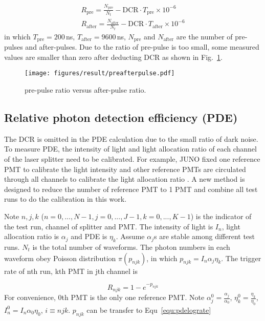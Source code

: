 \begin{align}
    R_{\mathrm{pre}} = \frac{N_{\mathrm{pre}}}{N_t} - \mathrm{DCR}\cdot T_{\mathrm{pre}}\times10^{-6}\\
    R_{\mathrm{after}} = \frac{N_{\mathrm{after}}}{N_t} - \mathrm{DCR}\cdot T_{\mathrm{after}}\times10^{-6}
\end{align}
in which $T_{\mathrm{pre}}=200$\,ns, $T_{\mathrm{after}}=9600$\,ns, $N_{\mathrm{pre}}$ and $N_{\mathrm{after}}$ are the number of pre-pulses and after-pulses. Due to the ratio of pre-pulse is too small, some measured values are smaller than zero after deducting DCR as shown in Fig.~\ref{fig:prepulseCompare}.

\begin{figure}[!htbp]
    \centering
    \texttt{[image: figures/result/preafterpulse.pdf]}
    \caption{pre-pulse ratio versus after-pulse ratio.}
    \label{fig:prepulseCompare}
\end{figure}

\subsection{Relative photon detection efficiency (PDE)}
The DCR is omitted in the PDE calculation due to the small ratio of dark noise. To measure PDE, the intensity of light and light allocation ratio of each channel of the laser splitter need to be calibrated. For example, JUNO fixed one reference PMT to calibrate the light intensity and other reference PMTs are circulated through all channels to calibrate the light allocation ratio \cite{Wonsak_2021}. A new method is designed to reduce the number of reference PMT to 1 PMT and combine all test runs to do the calibration in this work.

Note $n,j,k$ ($n=0,...,N-1, j=0,...,J-1, k=0,...,K-1$) is the indicator of the test run, channel of splitter and PMT. The intensity of light is $I_n$, light allocation ratio is $\alpha_j$ and PDE is $\eta_k$. Assume $\alpha_j$s are stable among different test runs. $N_t$ is the total number of waveforms. The photon numbers in each waveform obey Poisson distribution $\pi(p_{njk})$, in which $p_{njk}=I_n\alpha_j\eta_k$. The trigger rate of nth run, kth PMT in jth channel is

\begin{equation}
    \label{equ:pderate}
    R_{njk}=1-e^{-p_{njk}}
\end{equation}
For convenience, 0th PMT is the only one reference PMT. Note $\alpha_j^0=\frac{\alpha_j}{\alpha_0}$, $\eta_k^0=\frac{\eta_k}{\eta_0}$, $I_n^0=I_n\alpha_0\eta_0$, $i\equiv njk$. $p_{njk}$ can be transfer to Equ~\eqref{equ:pdelograte}

